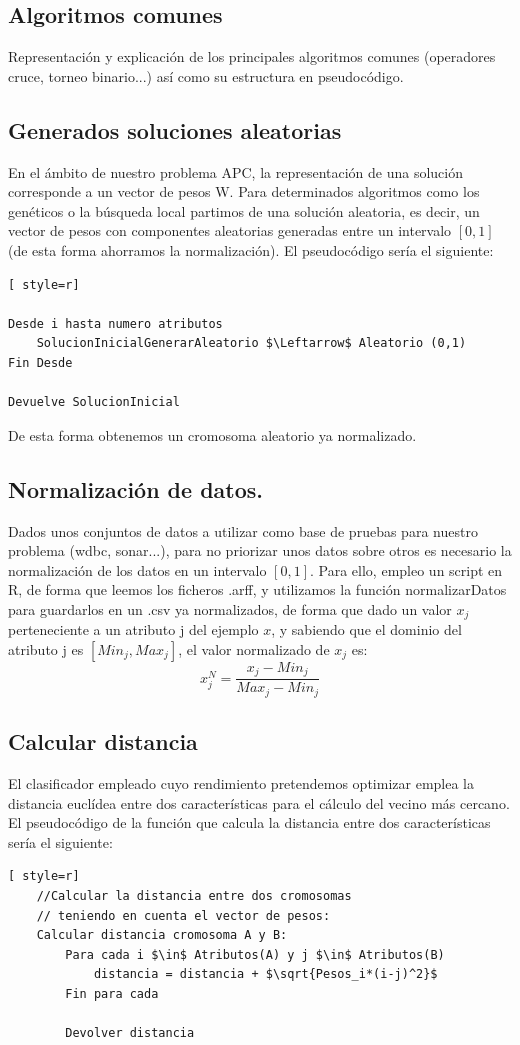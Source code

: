 \subsection{Algoritmos comunes}
Representación y explicación de los principales algoritmos comunes (operadores cruce, torneo binario...) así como su estructura en pseudocódigo.

\subsection{Generados soluciones aleatorias}
En el ámbito de nuestro problema APC, la representación de una solución corresponde a un vector de pesos W.
Para determinados algoritmos como los genéticos o la búsqueda local partimos de una solución aleatoria, es decir, un vector de pesos con componentes aleatorias generadas entre un intervalo $[0,1]$ (de esta forma ahorramos la normalización). El pseudocódigo sería el siguiente:

\begin{lstlisting}[ style=r]

Desde i hasta numero atributos
	SolucionInicialGenerarAleatorio $\Leftarrow$ Aleatorio (0,1)
Fin Desde

Devuelve SolucionInicial
\end{lstlisting}

De esta forma obtenemos un cromosoma aleatorio ya normalizado.

\subsection{Normalización de datos.}
Dados unos conjuntos de datos a utilizar como base de pruebas para nuestro problema (wdbc, sonar...), para no priorizar unos datos sobre otros es necesario la normalización de los datos en un intervalo $[0,1]$. Para ello, empleo un script en R, de forma que leemos los ficheros .arff, y utilizamos la función normalizarDatos para guardarlos en un .csv ya normalizados, de forma que dado un valor $x_j$ perteneciente a un atributo j del ejemplo $x$, y sabiendo que el dominio del atributo j es $[Min_j, Max_j]$, el valor normalizado de $x_j$ es:
\[
x_j^N = \frac{x_j -Min_j}{Max_j - Min_j}
\]

\subsection{Calcular distancia}
El clasificador empleado cuyo rendimiento pretendemos optimizar emplea la distancia euclídea entre dos características para el cálculo del vecino más cercano.\\ 
El pseudocódigo de la función que calcula la distancia entre dos características sería el siguiente:
\begin{lstlisting}[ style=r]
	//Calcular la distancia entre dos cromosomas
	// teniendo en cuenta el vector de pesos:
	Calcular distancia cromosoma A y B:
		Para cada i $\in$ Atributos(A) y j $\in$ Atributos(B)
			distancia = distancia + $\sqrt{Pesos_i*(i-j)^2}$
		Fin para cada
		
		Devolver distancia
\end{lstlisting}

